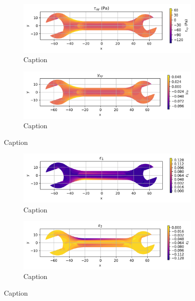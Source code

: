 \begin{figure}[H]
  \centering
  \begin{subfigure}[t]{0.49\textwidth}
    \centering
    \includegraphics[width=\textwidth]{GRAFICOS/Case a - tau_xy.png}
    \caption{Caption}
    \label{fig:deformada_reacciones}
  \end{subfigure}
  \hfill
  \begin{subfigure}[t]{0.49\textwidth}
    \centering
    \includegraphics[width=\textwidth]{GRAFICOS/Case a - gamma_xy.png}
    \caption{Caption}
    \label{fig:von_mises}
  \end{subfigure}
  \caption{Caption}
  \label{fig:analisis_estructural}
\end{figure}

\begin{figure}[H]
  \centering
  \begin{subfigure}[t]{0.49\textwidth}
    \centering
    \includegraphics[width=\textwidth]{GRAFICOS/Case a - epsilon_1.png}
    \caption{Caption}
    \label{fig:deformada_reacciones}
  \end{subfigure}
  \hfill
  \begin{subfigure}[t]{0.49\textwidth}
    \centering
    \includegraphics[width=\textwidth]{GRAFICOS/Case a - epsilon_2.png}
    \caption{Caption}
    \label{fig:von_mises}
  \end{subfigure}
  \caption{Caption}
  \label{fig:analisis_estructural}
\end{figure}

